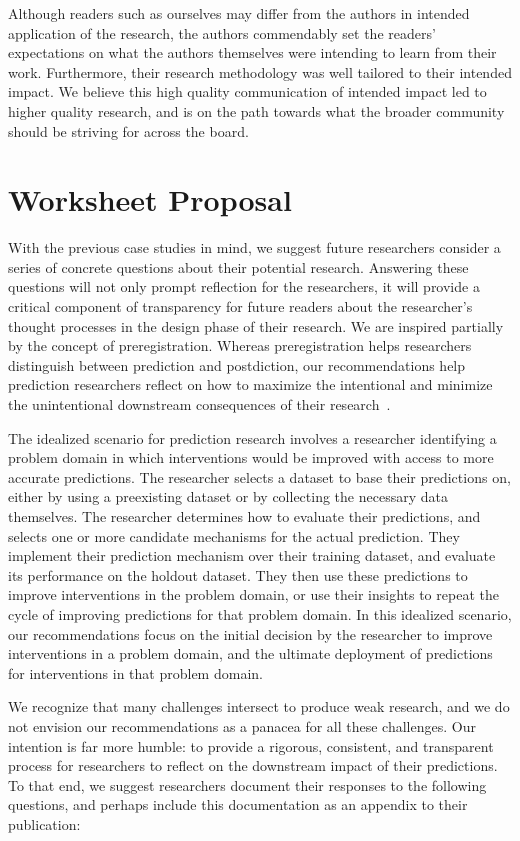 \documentclass[12pt]{article}
\begin{document}
        Although readers such as ourselves may differ from the authors in intended application of the research, the authors commendably set the readers' expectations on what the authors themselves were intending to learn from their work. Furthermore, their research methodology was well tailored to their intended impact. We believe this high quality communication of intended impact led to higher quality research, and is on the path towards what the broader community should be striving for across the board. 
        
\section{Worksheet Proposal}\label{best-practices}
    With the previous case studies in mind, we suggest future researchers consider a series of concrete questions about their potential research. Answering these questions will not only prompt reflection for the researchers, it will provide a critical component of transparency for future readers about the researcher's thought processes in the design phase of their research. We are inspired partially by the concept of preregistration. Whereas preregistration helps researchers distinguish between prediction and postdiction, our recommendations help prediction researchers reflect on how to maximize the intentional and minimize the unintentional downstream consequences of their research~\cite{preregister}. 

    The idealized scenario for prediction research involves a researcher identifying a problem domain in which interventions would be improved with access to more accurate predictions. The researcher selects a dataset to base their predictions on, either by using a preexisting dataset or by collecting the necessary data themselves. The researcher determines how to evaluate their predictions, and selects one or more candidate mechanisms for the actual prediction. They implement their prediction mechanism over their training dataset, and evaluate its performance on the holdout dataset. They then use these predictions to improve interventions in the problem domain, or use their insights to repeat the cycle of improving predictions for that problem domain. In this idealized scenario, our recommendations focus on the initial decision by the researcher to improve interventions in a problem domain, and the ultimate deployment of predictions for interventions in that problem domain. 

    We recognize that many challenges intersect to produce weak research, and we do not envision our recommendations as a panacea for all these challenges. Our intention is far more humble: to provide a rigorous, consistent, and transparent process for researchers to reflect on the downstream impact of their predictions. To that end, we suggest researchers document their responses to the following questions, and perhaps include this documentation as an appendix to their publication: 
\end{document}
